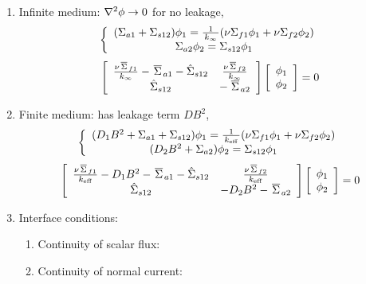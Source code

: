 \documentclass{school-22.211-notes}
\begin{document}
\begin{enumerate}
\begin{enumerate}
  \item Infinite medium: $\nabla^2 \phi \to 0$ for no leakage,
    \begin{align}
      \left\{ \begin{array}{c}
        (\Sigma_{a1} + \Sigma_{s12} ) \phi_1 = \frac{1}{\left. k_{\infty} \right.} ( \nu \Sigma_{f1} \phi_1 + \nu \Sigma_{f2} \phi_2 )   \\
        \Sigma_{a2} \phi_2 = \Sigma_{s12} \phi_1
      \end{array} \right. 
    \end{align}
    \begin{align}
      \left[ \begin{array}{cc} 
          \frac{\nu \left.\overline{\Sigma} \right._{f1}}{\left. k_{\infty} \right.} -  \left.\overline{\Sigma} \right._{a1}  - \hat{\Sigma}_{s12} & \frac{\nu \left.\overline{\Sigma} \right._{f2}}{\left. k_{\infty} \right.}   \\
          \hat{\Sigma}_{s12} &  - \left.\overline{\Sigma} \right._{a2}  
        \end{array} \right] 
      \left[ \begin{array}{c} \phi_1 \\ \phi_2 \end{array} \right] = 0
    \end{align}

  \item Finite medium: has leakage term $DB^2$, 
    \begin{align}
      \left\{ \begin{array}{c}
        (D_1 B^2 + \Sigma_{a1} + \Sigma_{s12} ) \phi_1 = \frac{1}{\left. k_{\mathrm{eff}} \right.} ( \nu \Sigma_{f1} \phi_1 + \nu \Sigma_{f2} \phi_2 )  \\
        (D_2 B^2 +  \Sigma_{a2}) \phi_2 = \Sigma_{s12} \phi_1 
      \end{array} \right. 
    \end{align}
    \begin{align}
      \left[ \begin{array}{cc} 
          \frac{\nu \left.\overline{\Sigma} \right._{f1}}{\left. k_{\mathrm{eff}} \right.} - D_1 B^2 -  \left.\overline{\Sigma} \right._{a1}  - \hat{\Sigma}_{s12} & \frac{\nu \left.\overline{\Sigma} \right._{f2}}{\left. k_{\mathrm{eff}} \right.}   \\
          \hat{\Sigma}_{s12} &  - D_2B^2 - \left.\overline{\Sigma} \right._{a2}  
        \end{array} \right] 
      \left[ \begin{array}{c} \phi_1 \\ \phi_2 \end{array} \right] = 0
    \end{align}

  \item Interface conditions: 
    \begin{enumerate}
    \item Continuity of scalar flux: 
    \item Continuity of normal current:
    \end{enumerate}
  \end{enumerate}




\end{enumerate}
\end{document}
